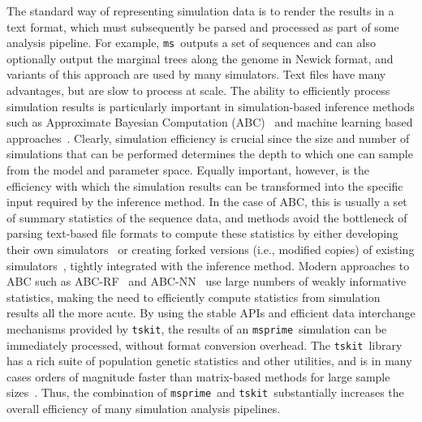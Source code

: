 \documentclass{article}
\newcommand{\msprime}[0]{\texttt{msprime}}
\newcommand{\tskit}[0]{\texttt{tskit}}
\newcommand{\ms}[0]{\texttt{ms}}
\begin{document}
The standard way of representing simulation data is
to render the results in a text format, which must subsequently
be parsed and processed as part of some analysis pipeline. For example,
\ms\ outputs a set of sequences
and can also optionally output the marginal trees along
the genome in Newick format,
and variants of this approach are used by many simulators.
Text files have many advantages, but are slow to process at scale.
The ability to efficiently process simulation results is
particularly important in simulation-based inference methods
such as Approximate Bayesian Computation
(ABC)~\citep{beaumont2002approximate,csillery2010approximate,wegmann2010abctoolbox}
and machine learning based
approaches~\citep{sheehan2016deep,chan2018likelihood,schrider2018supervised,
flagel2019unreasonable,sanchez2020deep}. Clearly, simulation efficiency is
crucial since the size and number of simulations that can be performed determines
the depth to which one can sample from the model and parameter space.
Equally important,
however, is the efficiency with which the simulation results can be
transformed into the specific input required by the inference method.
In the case of ABC, this is usually a set of summary statistics of the sequence
data, and methods avoid the bottleneck of parsing
text-based file formats to compute these statistics
by either developing their own
simulators~\citep[e.g.][]{cornuet2008inferring,lopes2009popabc}
or creating forked versions (i.e., modified copies) of existing
simulators~\cite[e.g.][]{thornton2006approximate,
hickerson2007msbayes,pavlidis2010msabc,huang2011mtml,quinto2018modeling},
tightly integrated with the inference method.
Modern approaches to ABC such as
ABC-RF~\citep{raynal2019abc,pudlo2016abc} and
ABC-NN~\citep{csillery2012abc,blum2010abc} use large
numbers of weakly informative statistics,
making the need to efficiently compute statistics from simulation
results all the more acute.
By using the stable APIs and efficient data interchange mechanisms
provided by \tskit,
the results of an \msprime\ simulation can be immediately processed,
without format conversion overhead.
The \tskit\ library has a rich suite of population
genetic statistics and other utilities, and is in many cases
orders of magnitude faster than matrix-based methods for
large sample sizes~\citep{ralph2020efficiently}. Thus, the combination
of \msprime\ and \tskit\ substantially increases the overall
efficiency of many simulation analysis pipelines.
\end{document}
